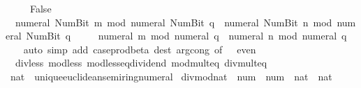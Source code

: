 \begin{isabellebody}
\ \ \ \ {\isasymlongleftrightarrow}\ False{\isachardoublequoteclose}\isanewline
\ \ {\isachardoublequoteopen}numeral\ {\isacharparenleft}{\kern0pt}Num{\isachardot}{\kern0pt}Bit{}\ m{\isacharparenright}{\kern0pt}\ mod\ numeral\ {\isacharparenleft}{\kern0pt}Num{\isachardot}{\kern0pt}Bit{}\ q{\isacharparenright}{\kern0pt}\ {\isacharequal}{\kern0pt}\ {\isacharparenleft}{\kern0pt}numeral\ {\isacharparenleft}{\kern0pt}Num{\isachardot}{\kern0pt}Bit{}\ n{\isacharparenright}{\kern0pt}\ mod\ numeral\ {\isacharparenleft}{\kern0pt}Num{\isachardot}{\kern0pt}Bit{}\ q{\isacharparenright}{\kern0pt}{\isacharparenright}{\kern0pt}\isanewline
\ \ \ \ {\isasymlongleftrightarrow}\ numeral\ m\ mod\ numeral\ q\ {\isacharequal}{\kern0pt}\ {\isacharparenleft}{\kern0pt}numeral\ n\ mod\ numeral\ q{\isacharparenright}{\kern0pt}{\isachardoublequoteclose}\isanewline
%
\isadelimproof
\ \ %
\endisadelimproof
%
\isatagproof
{}\isamarkupfalse%
\ {\isacharparenleft}{\kern0pt}auto\ simp\ add{\isacharcolon}{\kern0pt}\ case{\isacharunderscore}{\kern0pt}prod{\isacharunderscore}{\kern0pt}beta\ dest{\isacharcolon}{\kern0pt}\ arg{\isacharunderscore}{\kern0pt}cong\ {\isacharbrackleft}{\kern0pt}of\ {\isacharunderscore}{\kern0pt}\ {\isacharunderscore}{\kern0pt}\ even{\isacharbrackright}{\kern0pt}{\isacharparenright}{\kern0pt}%
\endisatagproof
{\isafoldproof}%
%
\isadelimproof
\isanewline
%
\endisadelimproof
\isanewline
{}\isamarkupfalse%
\isanewline
\isanewline
{}\isamarkupfalse%
\ {\isacharparenleft}{\kern0pt}\ div{\isacharunderscore}{\kern0pt}less\ mod{\isacharunderscore}{\kern0pt}less\ mod{\isacharunderscore}{\kern0pt}less{\isacharunderscore}{\kern0pt}eq{\isacharunderscore}{\kern0pt}dividend\ mod{\isacharunderscore}{\kern0pt}mult{}{\isacharunderscore}{\kern0pt}eq\ div{\isacharunderscore}{\kern0pt}mult{}{\isacharunderscore}{\kern0pt}eq\isanewline
\isanewline
{}\isamarkupfalse%
\ nat\ {\isacharcolon}{\kern0pt}{\isacharcolon}{\kern0pt}\ unique{\isacharunderscore}{\kern0pt}euclidean{\isacharunderscore}{\kern0pt}semiring{\isacharunderscore}{\kern0pt}numeral\isanewline
{}\isanewline
\isanewline
{}\isamarkupfalse%
\ divmod{\isacharunderscore}{\kern0pt}nat\ {\isacharcolon}{\kern0pt}{\isacharcolon}{\kern0pt}\ {\isachardoublequoteopen}num\ {\isasymRightarrow}\ num\ {\isasymRightarrow}\ nat\ {\isasymtimes}\ nat{\isachardoublequoteclose}\isanewline
{}\isanewline

\end{isabellebody}
